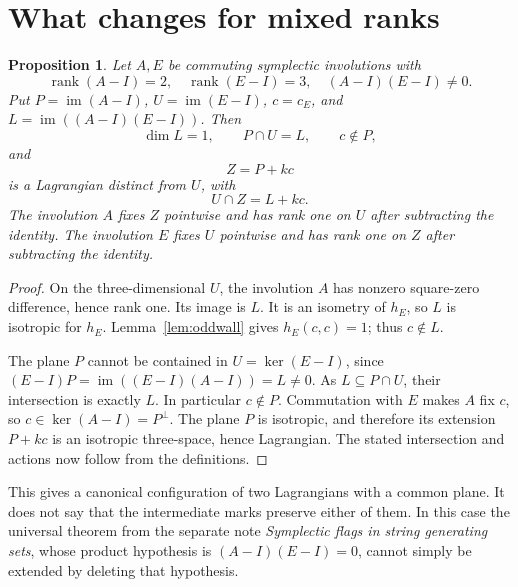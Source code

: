 \documentclass[11pt]{article}
\newtheorem{proposition}[theorem]{Proposition}
\newcommand{\im}{\operatorname{im}}
\begin{document}
\section{What changes for mixed ranks}

\begin{proposition}\label{prop:mixed}
Let \(A,E\) be commuting symplectic involutions with
\[
 \operatorname{rank}(A-I)=2,\quad
 \operatorname{rank}(E-I)=3,\quad (A-I)(E-I)\ne0.
\]
Put \(P=\im(A-I)\), \(U=\im(E-I)\), \(c=c_E\), and
\(L=\im((A-I)(E-I))\). Then
\[
 \dim L=1,\qquad P\cap U=L,\qquad c\notin P,
\]
and
\[
                       Z=P+kc
\]
is a Lagrangian distinct from \(U\), with
\[
 U\cap Z=L+kc.
\]
The involution \(A\) fixes \(Z\) pointwise and has rank one on
\(U\) after subtracting the identity. The involution \(E\)
fixes \(U\) pointwise and has rank one on \(Z\) after subtracting
the identity.
\end{proposition}
\begin{proof}
On the three-dimensional \(U\), the involution \(A\) has
nonzero square-zero difference, hence rank one. Its image is \(L\).
It is an isometry of \(h_E\), so \(L\) is isotropic for \(h_E\).
Lemma~\ref{lem:oddwall} gives \(h_E(c,c)=1\); thus \(c\notin L\).

The plane \(P\) cannot be contained in \(U=\ker(E-I)\),
since \((E-I)P=\im((E-I)(A-I))=L\ne0\).
As \(L\subseteq P\cap U\), their intersection is exactly \(L\).
In particular \(c\notin P\).
Commutation with \(E\) makes \(A\) fix \(c\), so
\(c\in\ker(A-I)=P^\perp\).
The plane \(P\) is isotropic, and therefore its extension
\(P+kc\) is an isotropic three-space, hence Lagrangian.
The stated intersection and actions now follow from the definitions.
\end{proof}

This gives a canonical configuration of two Lagrangians with a
common plane. It does not say that the intermediate marks preserve
either of them. In this case the universal theorem from the separate
note \emph{Symplectic flags in string generating sets}, whose
product hypothesis is \((A-I)(E-I)=0\), cannot simply be extended
by deleting that hypothesis.
\end{document}
